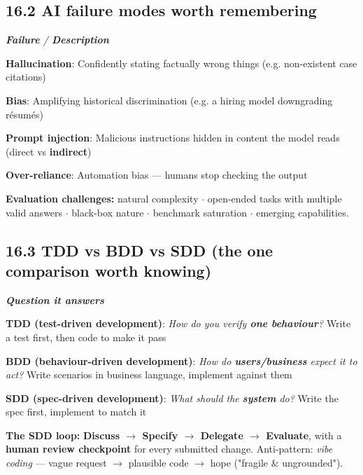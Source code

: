 \begin{studycolumns}
\subsection*{16.2 AI failure modes worth remembering}

\begin{referenceentries}
\textit{\textbf{Failure} / \textbf{Description}}\par\smallskip
\noindent \textbf{\textbf{Hallucination}}: Confidently stating factually wrong things (e.g. non-existent case citations)\par
\noindent \textbf{\textbf{Bias}}: Amplifying historical discrimination (e.g. a hiring model downgrading r\'{e}sum\'{e}s)\par
\noindent \textbf{\textbf{Prompt injection}}: Malicious instructions hidden in content the model reads (direct vs \textbf{indirect})\par
\noindent \textbf{\textbf{Over-reliance}}: Automation bias --- humans stop checking the output\par
\end{referenceentries}
\textbf{Evaluation challenges:} natural complexity \ensuremath{\cdot} open-ended tasks with multiple valid answers \ensuremath{\cdot} black-box nature \ensuremath{\cdot} benchmark saturation \ensuremath{\cdot} emerging capabilities.

\subsection*{16.3 TDD vs BDD vs SDD (the one comparison worth knowing)}

\begin{referenceentries}
\textit{\textbf{Question it answers}}\par\smallskip
\noindent \textbf{\textbf{TDD} (test-driven development)}: \emph{How do you verify \textbf{one behaviour}?} Write a test first, then code to make it pass\par
\noindent \textbf{\textbf{BDD} (behaviour-driven development)}: \emph{How do \textbf{users/\allowbreak{}business} expect it to act?} Write scenarios in business language, implement against them\par
\noindent \textbf{\textbf{SDD} (spec-driven development)}: \emph{What should the \textbf{system} do?} Write the spec first, implement to match it\par
\end{referenceentries}
\textbf{The SDD loop:} \textbf{Discuss \ensuremath{\rightarrow} Specify \ensuremath{\rightarrow} Delegate \ensuremath{\rightarrow} Evaluate}, with a \textbf{human review checkpoint} for every submitted change. Anti-pattern: \emph{vibe coding} --- vague request \ensuremath{\rightarrow} plausible code \ensuremath{\rightarrow} hope ("fragile \& ungrounded").


\end{studycolumns}
